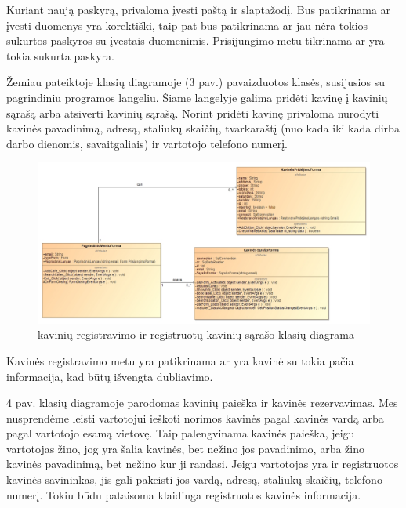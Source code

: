 \documentclass{VUMIFPSkursinis}
\begin{document}
Kuriant naują paskyrą, privaloma įvesti paštą ir slaptažodį. Bus patikrinama ar įvesti duomenys yra korektiški, taip pat bus patikrinama ar jau nėra tokios sukurtos paskyros su įvestais duomenimis. Prisijungimo metu tikrinama ar yra tokia sukurta paskyra.

\pagebreak
Žemiau pateiktoje klasių diagramoje (3 pav.) pavaizduotos klasės, susijusios su pagrindiniu programos langeliu. Šiame langelyje galima pridėti kavinę į kavinių sąrašą arba atsiverti kavinių sąrašą. Norint pridėti kavinę privaloma nurodyti kavinės pavadinimą, adresą, staliukų skaičių, tvarkaraštį (nuo kada iki kada dirba darbo dienomis, savaitgaliais) ir vartotojo telefono numerį.
\newline
\newline
\newline
\newline
\newline
\newline
\begin{figure}[H]
    \centering
    \includegraphics[width=\textwidth,height=\textheight,keepaspectratio]{img/MainMenu_AddRestaurant_ListForm} 
    \caption{kavinių registravimo ir registruotų kavinių sąrašo klasių diagrama}
    \label{img:MainMenu_AddRestaurant_ListForm}
\end{figure}

Kavinės registravimo metu yra patikrinama ar yra kavinė su tokia pačia informacija, kad būtų išvengta dubliavimo.

\pagebreak
4 pav. klasių diagramoje parodomas kavinių paieška ir kavinės rezervavimas. Mes nusprendėme leisti vartotojui ieškoti norimos kavinės pagal kavinės vardą arba pagal vartotojo esamą vietovę. Taip palengvinama kavinės paieška, jeigu vartotojas žino, jog yra šalia kavinės, bet nežino jos pavadinimo, arba žino kavinės pavadinimą, bet nežino kur ji randasi. Jeigu vartotojas yra ir registruotos kavinės savininkas, jis  gali pakeisti jos vardą, adresą, staliukų skaičių, telefono numerį. Tokiu būdu pataisoma klaidinga registruotos kavinės informacija.
\newline
\newline
\newline
\newline
\newline
\newline
\newline
\newline
\end{document}
